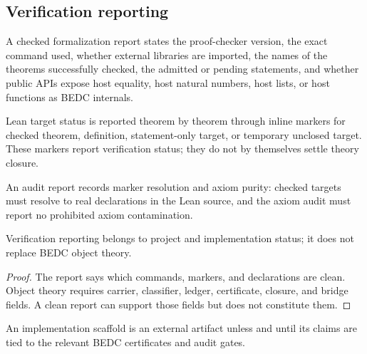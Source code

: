 \subsection{Verification reporting}
\label{subsec:philosophy-programme-verification-reporting}

\begin{definition}
\label{def:philosophy-programme-checked-report}
A checked formalization report states the proof-checker version, the
exact command used, whether external libraries are imported, the names
of the theorems successfully checked, the admitted or pending
statements, and whether public APIs expose host equality, host natural
numbers, host lists, or host functions as BEDC internals.
\end{definition}

\begin{definition}
\label{def:philosophy-programme-lean-target-status}
Lean target status is reported theorem by theorem through inline
markers for checked theorem, definition, statement-only target, or
temporary unclosed target. These markers report verification status;
they do not by themselves settle theory closure.
\end{definition}

\begin{definition}
\label{def:philosophy-programme-audit-report}
An audit report records marker resolution and axiom purity: checked
targets must resolve to real declarations in the Lean source, and the
axiom audit must report no prohibited axiom contamination.
\end{definition}

\begin{theorem}
\label{thm:philosophy-programme-verification-not-object-theory}
Verification reporting belongs to project and implementation status;
it does not replace BEDC object theory.
\end{theorem}
\begin{proof}
The report says which commands, markers, and declarations are clean.
Object theory requires carrier, classifier, ledger, certificate,
closure, and bridge fields. A clean report can support those fields but
does not constitute them.
\end{proof}

\begin{corollary}
\label{cor:philosophy-programme-scaffold-external}
An implementation scaffold is an external artifact unless and until its
claims are tied to the relevant BEDC certificates and audit gates.
\end{corollary}

